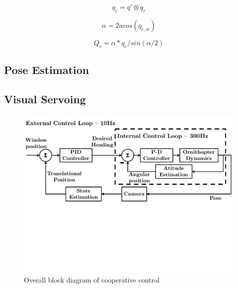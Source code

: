 \documentclass{aamas2013}
\begin{document}
\begin{equation}
\label{quat_error}
q_e = q'\otimes q_r
\end{equation}

\begin{equation}
\label{quat_angle}
\alpha = 2acos(q_{e,w})
\end{equation}

\begin{equation}
\label{quat_linearize}
Q_e = \alpha*q_e/sin(\alpha /2)
\end{equation}

\subsection{Pose Estimation}

\subsection{Visual Servoing}

\begin{figure}[tb]
\centering
\includegraphics[width=\linewidth]{figures/block_diagrams.pdf}
\caption{Overall block diagram of cooperative control}
\label{fig:block_diagram}
\end{figure}
\end{document}
